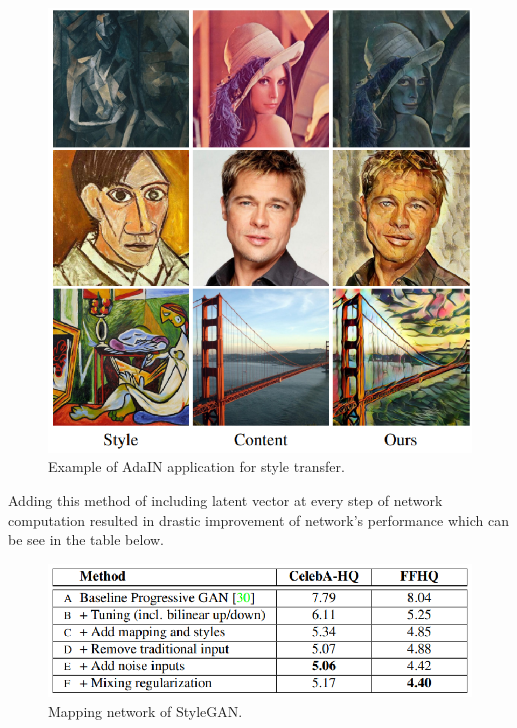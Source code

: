 \documentclass[12pt,a4paper,openany]{book}
\begin{document}
\begin{figure}[ht!]
    \centering
    \includegraphics[scale=1.0]{figs/adaptive-instance-norm.eps}
    \caption{Example of AdaIN application for style transfer.}\label{Fig:STYLEGAN}
\end{figure}

Adding this method of including latent vector at every step of network computation resulted in drastic improvement of network's performance which can be see in the table below.

\begin{figure}[ht!]
    \centering
    \includegraphics[scale=1.2]{figs/frechet-distance.eps}
    \caption{Mapping network of StyleGAN.}\label{Fig:STYLEGAN}
\end{figure}



\end{document}
